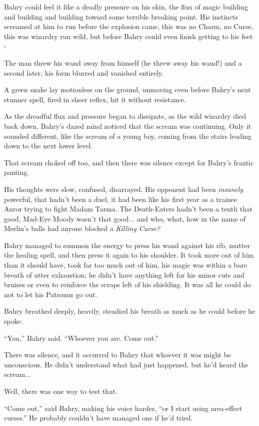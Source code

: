 Bahry could feel it like a deadly pressure on his skin, the flux of
magic building and building and building toward some terrible breaking
point. His instincts screamed at him to run before the explosion came,
this was no Charm, no Curse, this was wizardry run wild, but before
Bahry could even finish getting to his feet -

The man threw his wand away from himself (he threw away his wand!) and a
second later, his form blurred and vanished entirely.

A green snake lay motionless on the ground, unmoving even before Bahry's
next stunner spell, fired in sheer reflex, hit it without resistance.

As the dreadful flux and pressure began to dissipate, as the wild
wizardry died back down, Bahry's dazed mind noticed that the scream was
continuing. Only it sounded different, like the scream of a young boy,
coming from the stairs leading down to the next lower level.

That scream choked off too, and then there was silence except for
Bahry's frantic panting.

His thoughts were slow, confused, disarrayed. His opponent had been
\emph{insanely} powerful, that hadn't been a duel, it had been like his
first year as a trainee Auror trying to fight Madam Tarma. The
Death-Eaters hadn't been a tenth that good, Mad-Eye Moody wasn't that
good... and who, what, how in the name of Merlin's balls had anyone
blocked a \emph{Killing Curse?}

Bahry managed to summon the energy to press his wand against his rib,
mutter the healing spell, and then press it again to his shoulder. It
took more out of him than it should have, took far too much out of him,
his magic was within a bare breath of utter exhaustion; he didn't have
anything left for his minor cuts and bruises or even to reinforce the
scraps left of his shielding. It was all he could do not to let his
Patronus go out.

Bahry breathed deeply, heavily, steadied his breath as much as he could
before he spoke.

``You,'' Bahry said. ``Whoever you are. Come out.''

There was silence, and it occurred to Bahry that whoever it was might be
unconscious. He didn't understand what had just happened, but he'd heard
the scream...

Well, there was one way to test that.

``Come out,'' said Bahry, making his voice harder, ``or I start using
area-effect curses.'' He probably couldn't have managed one if he'd
tried.

